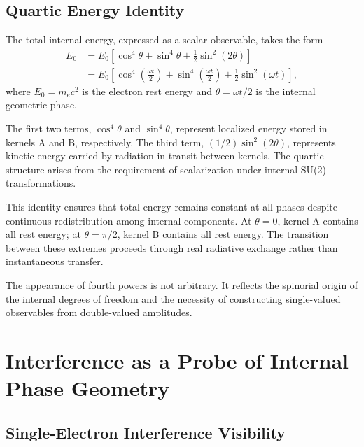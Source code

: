 \documentclass[%
 reprint,
 amsmath,amssymb,
 aps,
 prb,
]{revtex4-2}
\numberwithin{equation}{section}
\begin{document}
\subsection{Quartic Energy Identity}
\label{subsec:quartic_identity}

The total internal energy, expressed as a scalar observable, takes the form
\begin{equation}
\begin{aligned}
E_0 &= E_0 \left[ \cos^4\theta + \sin^4\theta + \frac{1}{2}\sin^2(2\theta) \right] \\
&= E_0 \left[ \cos^4\left(\frac{\omega t}{2}\right) + \sin^4\left(\frac{\omega t}{2}\right) + \frac{1}{2}\sin^2(\omega t) \right],
\end{aligned}
\label{eq:energy_identity}
\end{equation}
where $E_0 = m_e c^2$ is the electron rest energy and $\theta = \omega t/2$ is the internal geometric phase.

The first two terms, $\cos^4\theta$ and $\sin^4\theta$, represent localized energy stored in kernels A and B, respectively. The third term, $(1/2)\sin^2(2\theta)$, represents kinetic energy carried by radiation in transit between kernels. The quartic structure arises from the requirement of scalarization under internal SU(2) transformations.

This identity ensures that total energy remains constant at all phases despite continuous redistribution among internal components. At $\theta = 0$, kernel A contains all rest energy; at $\theta = \pi/2$, kernel B contains all rest energy. The transition between these extremes proceeds through real radiative exchange rather than instantaneous transfer.

The appearance of fourth powers is not arbitrary. It reflects the spinorial origin of the internal degrees of freedom and the necessity of constructing single-valued observables from double-valued amplitudes.


\section{Interference as a Probe of Internal Phase Geometry}
\label{sec:interference}


\subsection{Single-Electron Interference Visibility}
\label{subsec:single_visibility}
\end{document}
